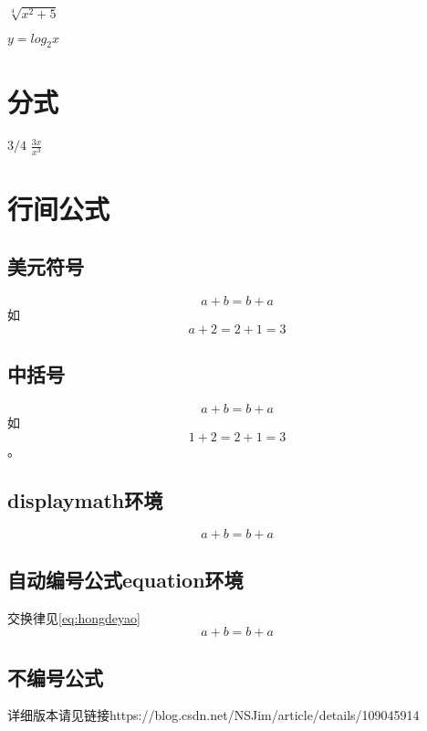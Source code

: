 \documentclass{article}
\begin{document}
    $\sqrt[4]{x^2+5}$

    $y=log_2 x$

    \section{分式}
    $3/4$
    $\frac{3x}{x^3}$

    \section{行间公式}
    \subsection{美元符号}
    $$a+b=b+a$$如$$a+2=2+1=3$$
    \subsection{中括号}
    \[a+b=b+a\]如\[1+2=2+1=3\]。
    \subsection{displaymath环境}
    \begin{displaymath}
        a+b=b+a
    \end{displaymath}
    \subsection{自动编号公式equation环境}
    交换律见\ref{eq:hongdeyao}
    \begin{equation}
        a+b=b+a  \label{eq:hongdeyao}
    \end{equation}
    \subsection{不编号公式}


    {\kaishu 详细版本请见链接https://blog.csdn.net/NSJim/article/details/109045914}
\end{document}
